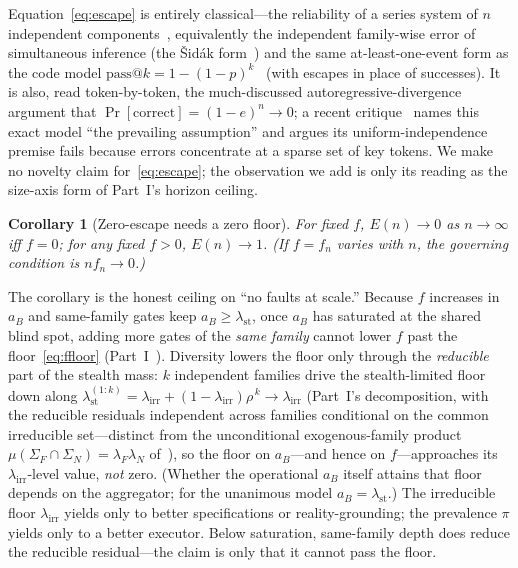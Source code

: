 \documentclass[11pt]{article}
\newtheorem{corollary}{Corollary}
\theoremstyle{definition}
\theoremstyle{remark}
\newcommand{\lst}{\lambda_{\mathrm{st}}}
\newcommand{\lirr}{\lambda_{\mathrm{irr}}}
\newcommand{\Esc}{E}
\newcommand{\fesc}{f}
\begin{document}
Equation~\eqref{eq:escape} is entirely classical---the reliability of a series system of $n$
independent components~\cite{barlowproschan1965}, equivalently the independent family-wise error of
simultaneous inference (the \v{S}id\'ak form~\cite{sidak1967}) and the same at-least-one-event form as
the code model $\mathrm{pass}@k=1-(1-p)^k$~\cite{chen2021,brown2024} (with escapes in place of successes). It is also, read token-by-token, the
much-discussed autoregressive-divergence argument that $\Pr[\text{correct}]=(1-e)^n\to0$; a recent
critique~\cite{arbuzov2025} names this exact model ``the prevailing assumption'' and argues its
uniform-independence premise fails because errors concentrate at a sparse set of key tokens. We make
no novelty claim for~\eqref{eq:escape}; the observation we add is only its reading as the size-axis
form of Part~I's horizon ceiling.

\begin{corollary}[Zero-escape needs a zero floor]\label{cor:zero}
For \emph{fixed} $\fesc$, $\Esc(n)\to0$ as $n\to\infty$ iff $\fesc=0$; for any fixed $\fesc>0$,
$\Esc(n)\to1$. (If $\fesc=\fesc_n$ varies with $n$, the governing condition is $n\fesc_n\to0$.)
\end{corollary}

The corollary is the honest ceiling on ``no faults at scale.'' Because $\fesc$ increases in $a_B$ and
same-family gates keep $a_B\ge\lst$, once $a_B$ has saturated at the shared blind spot, adding more
gates of the \emph{same family} cannot lower $\fesc$ past the floor~\eqref{eq:ffloor}
(Part~I~\cite{matijasevic2026n1}). Diversity lowers the floor only through the \emph{reducible} part of
the stealth mass: $k$ independent families drive the stealth-limited floor down along
$\lst^{(1{:}k)}=\lirr+(1-\lirr)\rho^{\,k}\to\lirr$ (Part~I's decomposition, with the reducible residuals
independent across families conditional on the common irreducible set---distinct from the unconditional
exogenous-family product $\mu(\Sigma_F\cap\Sigma_N)=\lambda_F\lambda_N$ of~\cite{matijasevic2026gg}), so
the floor on $a_B$---and hence on
$\fesc$---approaches its $\lirr$-level value, \emph{not} zero. (Whether the operational $a_B$ itself
attains that floor depends on the aggregator; for the unanimous model $a_B=\lst$.) The irreducible floor $\lirr$ yields only to better specifications
or reality-grounding; the prevalence $\pi$ yields only to a better executor. Below saturation,
same-family depth does reduce the reducible residual---the claim is only that it cannot pass the floor.
\end{document}
